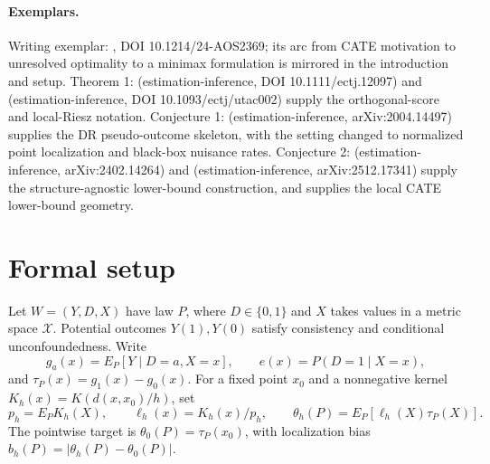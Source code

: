 \documentclass[11pt]{article}
\theoremstyle{definition}
\theoremstyle{plain}
\theoremstyle{remark}
\begin{document}
\paragraph{Exemplars.}
Writing exemplar: \citet{KennedyBalakrishnanRobinsWasserman2024MinimaxCATE}, DOI 10.1214/24-AOS2369; its arc from CATE motivation to unresolved optimality to a minimax formulation is mirrored in the introduction and setup.
Theorem 1: \citet{ChernozhukovEtAl2018DML} (estimation-inference, DOI 10.1111/ectj.12097) and \citet{ChernozhukovNeweySingh2022LocalRiesz} (estimation-inference, DOI 10.1093/ectj/utac002) supply the orthogonal-score and local-Riesz notation.
Conjecture 1: \citet{Kennedy2023DRCATE} (estimation-inference, arXiv:2004.14497) supplies the DR pseudo-outcome skeleton, with the setting changed to normalized point localization and black-box nuisance rates.
Conjecture 2: \citet{JinSyrgkanis2024StructureAgnosticDR} (estimation-inference, arXiv:2402.14264) and \citet{JinSyrgkanis2025GeneralLinearFunctionalLowerBounds} (estimation-inference, arXiv:2512.17341) supply the structure-agnostic lower-bound construction, and \citet{KennedyBalakrishnanRobinsWasserman2024MinimaxCATE} supplies the local CATE lower-bound geometry.

\section{Formal setup}\label{sec:setup}
Let $W=(Y,D,X)$ have law $P$, where $D\in\{0,1\}$ and $X$ takes values in a metric space $\mathcal{X}$.
Potential outcomes $Y(1),Y(0)$ satisfy consistency and conditional unconfoundedness.
Write
\[
  g_a(x)=E_P[Y\mid D=a,X=x],\qquad e(x)=P(D=1\mid X=x),
\]
and $\tau_P(x)=g_1(x)-g_0(x)$.
For a fixed point $x_0$ and a nonnegative kernel $K_h(x)=K(d(x,x_0)/h)$, set
\[
  p_h=E_P K_h(X),\qquad \ell_h(x)=K_h(x)/p_h,\qquad
  \theta_h(P)=E_P[\ell_h(X)\tau_P(X)].
\]
The pointwise target is $\theta_0(P)=\tau_P(x_0)$, with localization bias $b_h(P)=|\theta_h(P)-\theta_0(P)|$.
\end{document}
